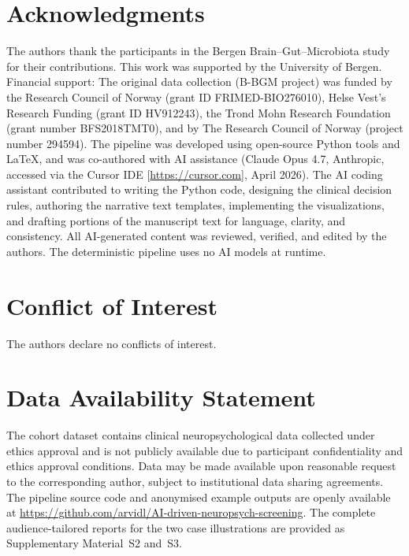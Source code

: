 \documentclass[11pt,a4paper]{article}
\begin{document}
\section*{Acknowledgments}

The authors thank the participants in the Bergen Brain--Gut--Microbiota study for their contributions. 
This work was supported by the University of Bergen. Financial support: The original data collection (B-BGM project) 
was funded by the Research Council of Norway (grant ID FRIMED-BIO276010), Helse Vest's Research Funding (grant ID HV912243), 
the Trond Mohn Research Foundation (grant number BFS2018TMT0), and by The Research Council of Norway (project number 294594). 
The pipeline was developed using open-source Python tools and \LaTeX, and was co-authored with AI assistance 
(Claude Opus 4.7, Anthropic, accessed via the Cursor IDE [\url{https://cursor.com}], April 2026). The AI coding assistant contributed to writing the Python code, designing the clinical decision rules, authoring the narrative text templates, implementing the visualizations, and drafting portions of the manuscript text for language, clarity, and consistency. All AI-generated content was reviewed, verified, and edited by the authors. The deterministic pipeline uses no AI models at runtime.

\section*{Conflict of Interest}

The authors declare no conflicts of interest.

\section*{Data Availability Statement}

The cohort dataset contains clinical neuropsychological data collected under ethics approval and is not publicly available due to participant confidentiality and ethics approval conditions. Data may be made available upon reasonable request to the corresponding author, subject to institutional data sharing agreements. 
The pipeline source code and anonymised example outputs are openly available 
at \url{https://github.com/arvidl/AI-driven-neuropsych-screening}. 
The complete audience-tailored reports for the two case illustrations are provided as Supplementary Material~S2 and~S3.
\end{document}
